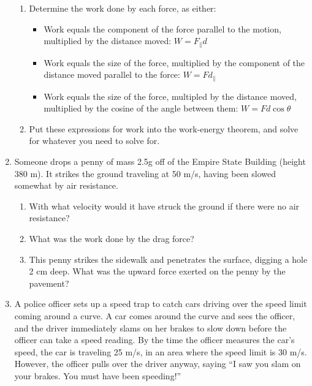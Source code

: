 \documentclass[12pt]{article}
\begin{document}
\begin{enumerate}
\begin{enumerate}
\item Determine the work done by each force, as either:
\begin{itemize}
\item Work equals the component of the force parallel to the motion, multiplied by the distance moved: $W = F_\parallel d$
\item Work equals the size of the force, multiplied by the component of the distance moved parallel to the force: $W = F d_\parallel$
\item Work equals the size of the force, multipled by the distance moved, multiplied by the cosine of the angle between them: $W = F d \cos \theta$
\end{itemize}

\item Put these expressions for work into the work-energy theorem, and solve for whatever you need to solve for.
\end{enumerate}

\newpage

\item{Someone drops a penny of mass 2.5g off of the Empire State Building (height 380 m). It strikes the ground traveling at 50 m/s, having been slowed somewhat by air resistance.}
\begin{enumerate}
\item{With what velocity would it have struck the ground if there were no air resistance?}
\vspace{2in}
\item{What was the work done by the drag force?}
\vspace{2in}
\item{This penny strikes the sidewalk and penetrates the surface, digging a hole 2 cm deep. What was the upward force exerted on the penny by the pavement?}
\vspace{2in}
\end{enumerate}

\newpage

  \item{A police officer sets up a speed trap to catch cars driving over the speed limit coming around a curve. A car comes around the curve and sees the officer, and the driver immediately slams on her brakes to slow down before the officer can take a speed reading. 
By the time the officer measures the car's speed, the car is traveling 25 m/s, in an area where the speed limit is 30 m/s. However, the officer pulls over the driver anyway, saying ``I saw you slam on your brakes. You must have been speeding!''

}
\end{enumerate}
\end{document}
